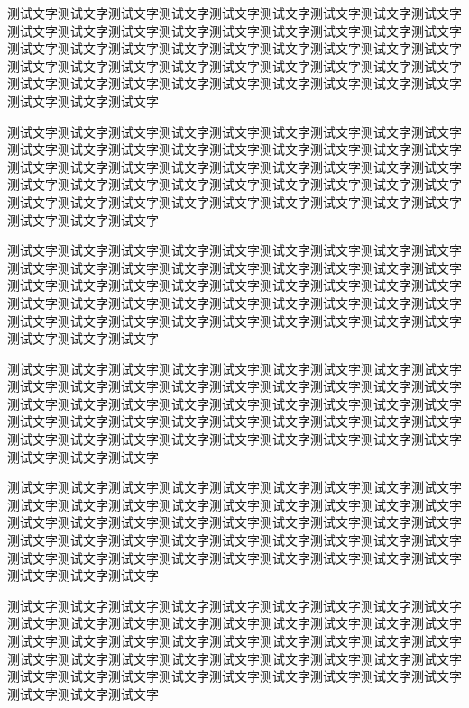 \begin{Project}
\begin{QuestionItem}[2]
	\item 测试文字测试文字测试文字测试文字测试文字测试文字测试文字测试文字测试文字测试文字测试文字测试文字测试文字测试文字测试文字测试文字测试文字测试文字测试文字测试文字测试文字测试文字测试文字测试文字测试文字测试文字测试文字测试文字测试文字测试文字测试文字测试文字测试文字测试文字测试文字测试文字测试文字测试文字测试文字测试文字测试文字测试文字测试文字测试文字测试文字测试文字测试文字测试文字
	\item 测试文字测试文字测试文字测试文字测试文字测试文字测试文字测试文字测试文字测试文字测试文字测试文字测试文字测试文字测试文字测试文字测试文字测试文字测试文字测试文字测试文字测试文字测试文字测试文字测试文字测试文字测试文字测试文字测试文字测试文字测试文字测试文字测试文字测试文字测试文字测试文字测试文字测试文字测试文字测试文字测试文字测试文字测试文字测试文字测试文字测试文字测试文字测试文字
\end{QuestionItem}


\Thinking
	\begin{QuestionItem}
		\item 测试文字测试文字测试文字测试文字测试文字测试文字测试文字测试文字测试文字测试文字测试文字测试文字测试文字测试文字测试文字测试文字测试文字测试文字测试文字测试文字测试文字测试文字测试文字测试文字测试文字测试文字测试文字测试文字测试文字测试文字测试文字测试文字测试文字测试文字测试文字测试文字测试文字测试文字测试文字测试文字测试文字测试文字测试文字测试文字测试文字测试文字测试文字测试文字
		\item 测试文字测试文字测试文字测试文字测试文字测试文字测试文字测试文字测试文字测试文字测试文字测试文字测试文字测试文字测试文字测试文字测试文字测试文字测试文字测试文字测试文字测试文字测试文字测试文字测试文字测试文字测试文字测试文字测试文字测试文字测试文字测试文字测试文字测试文字测试文字测试文字测试文字测试文字测试文字测试文字测试文字测试文字测试文字测试文字测试文字测试文字测试文字测试文字
		\item 测试文字测试文字测试文字测试文字测试文字测试文字测试文字测试文字测试文字测试文字测试文字测试文字测试文字测试文字测试文字测试文字测试文字测试文字测试文字测试文字测试文字测试文字测试文字测试文字测试文字测试文字测试文字测试文字测试文字测试文字测试文字测试文字测试文字测试文字测试文字测试文字测试文字测试文字测试文字测试文字测试文字测试文字测试文字测试文字测试文字测试文字测试文字测试文字
		\item 测试文字测试文字测试文字测试文字测试文字测试文字测试文字测试文字测试文字测试文字测试文字测试文字测试文字测试文字测试文字测试文字测试文字测试文字测试文字测试文字测试文字测试文字测试文字测试文字测试文字测试文字测试文字测试文字测试文字测试文字测试文字测试文字测试文字测试文字测试文字测试文字测试文字测试文字测试文字测试文字测试文字测试文字测试文字测试文字测试文字测试文字测试文字测试文字
	\end{QuestionItem}



\end{Project}
